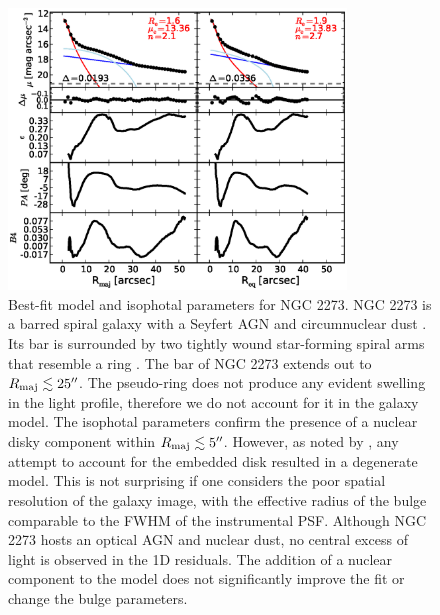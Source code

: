 \documentclass[preprint2]{emulateapj}
\newcommand{\fitfigurewidth}{0.8\textwidth}
\begin{document}
  \begin{figure}[h]
  \begin{center}
  \includegraphics[width=\fitfigurewidth]{images/n2273_1Dfit.eps}
  \caption{Best-fit model and isophotal parameters for NGC 2273.
  NGC 2273 is a barred spiral galaxy with a Seyfert AGN \citep{contini1998} 
  and circumnuclear dust \citep{simoeslopes2007}. 
  Its bar is surrounded by two tightly wound star-forming spiral arms that resemble a ring \citep{comeron2010}. 
  The bar of NGC 2273 extends out to $R_{\rm maj} \lesssim 25''$. 
  The pseudo-ring does not produce any evident swelling in the light profile, 
  therefore we do not account for it in the galaxy model.
  The isophotal parameters confirm the presence of a nuclear disky component within $R_{\rm maj} \lesssim 5''$.
  However, as noted by \cite{laurikainen2005}, any attempt to account for the embedded disk resulted in a degenerate model. 
  This is not surprising if one considers the poor spatial resolution of the galaxy image, 
  with the effective radius of the bulge comparable to the FWHM of the instrumental PSF.
  Although NGC 2273 hosts an optical AGN and nuclear dust, no central excess of light is observed in the 1D residuals.
  The addition of a nuclear component to the model does not significantly improve the fit or change the bulge parameters. 
  }
  \end{center}
  \end{figure}
\end{document}
